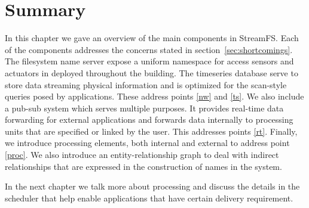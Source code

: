 \section{Summary}


In this chapter we gave an overview of the main components in StreamFS.  Each of the components addresses the concerns stated in 
section~\ref{sec:shortcomings}.  The filesystem name server expose a uniform namespace for access sensors and actuators in 
deployed throughout the building.  The timeseries database serve to store data streaming physical information and 
is optimized for the scan-style queries posed by applications.  These address points \ref{nw} and \ref{ts}.
We also include a pub-sub system which serves multiple purposes.  It provides real-time data forwarding for external
applications and forwards data internally to processing units that are specified or linked by the user.
This addresses points \ref{rt}.  Finally, we introduce processing elements, both internal and external to address
point \ref{proc}.  We also introduce an entity-relationship graph to deal with indirect relationships that are
expressed in the construction of names in the system.

In the next chapter we talk more about processing and discuss the details in the scheduler that help enable applications
that have certain delivery requirement.
